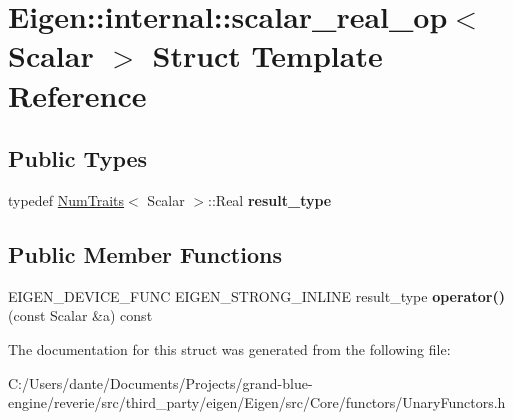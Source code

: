 \hypertarget{struct_eigen_1_1internal_1_1scalar__real__op}{}\section{Eigen\+::internal\+::scalar\+\_\+real\+\_\+op$<$ Scalar $>$ Struct Template Reference}
\label{struct_eigen_1_1internal_1_1scalar__real__op}
\subsection*{Public Types}
\begin{DoxyCompactItemize}
\item 
\mbox{\label{struct_eigen_1_1internal_1_1scalar__real__op_af6520ddd4677e32fc7c8d86c3d2f4033}} 
typedef \mbox{\hyperlink{struct_eigen_1_1_num_traits}{Num\+Traits}}$<$ Scalar $>$\+::Real {\bfseries result\+\_\+type}
\end{DoxyCompactItemize}
\subsection*{Public Member Functions}
\begin{DoxyCompactItemize}
\item 
\mbox{\label{struct_eigen_1_1internal_1_1scalar__real__op_ab7456c0d19c3abd50af51c799b0a5fee}} 
E\+I\+G\+E\+N\+\_\+\+D\+E\+V\+I\+C\+E\+\_\+\+F\+U\+NC E\+I\+G\+E\+N\+\_\+\+S\+T\+R\+O\+N\+G\+\_\+\+I\+N\+L\+I\+NE result\+\_\+type {\bfseries operator()} (const Scalar \&a) const
\end{DoxyCompactItemize}


The documentation for this struct was generated from the following file\+:\begin{DoxyCompactItemize}
\item 
C\+:/\+Users/dante/\+Documents/\+Projects/grand-\/blue-\/engine/reverie/src/third\+\_\+party/eigen/\+Eigen/src/\+Core/functors/Unary\+Functors.\+h\end{DoxyCompactItemize}
